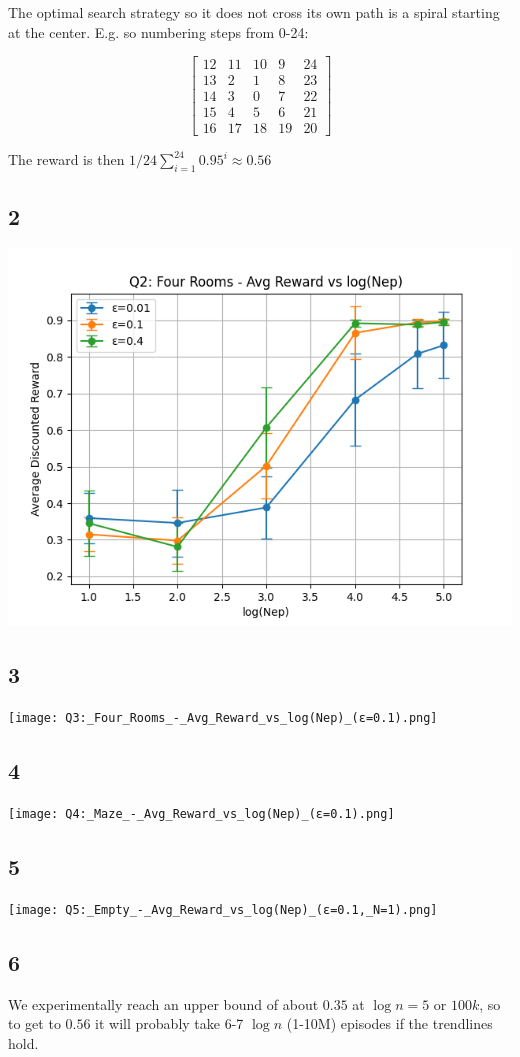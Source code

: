 \documentclass[11pt]{article}
\begin{document}
The optimal search strategy so it does not cross its own path is a spiral starting at the center. E.g. so numbering steps from 0-24:

$$
\begin{bmatrix}
    12 & 11 & 10 & 9 & 24 \\
    13 & 2 & 1 & 8 & 23 \\
    14 & 3 & 0 & 7 & 22 \\
    15 & 4 & 5 & 6 & 21 \\
    16 & 17 & 18 & 19 & 20
\end{bmatrix}
$$

The reward is then $1/24 \sum_{i=1}^{24} 0.95^i \approx 0.56$

\subsection{2}

\includegraphics{Q2:_Four_Rooms_-_Avg_Reward_vs_log(Nep).png}

\subsection{3}

\texttt{[image: Q3:\_Four\_Rooms\_-\_Avg\_Reward\_vs\_log(Nep)\_(ε=0.1).png]}

\subsection{4}

\texttt{[image: Q4:\_Maze\_-\_Avg\_Reward\_vs\_log(Nep)\_(ε=0.1).png]}

\subsection{5}

\texttt{[image: Q5:\_Empty\_-\_Avg\_Reward\_vs\_log(Nep)\_(ε=0.1,\_N=1).png]}

\subsection{6}

We experimentally reach an upper bound of about $0.35$ at $\log n = 5$ or $100k$, so to get to $0.56$ it will probably take 6-7 $\log n$ (1-10M) episodes if the trendlines hold.
\end{document}
